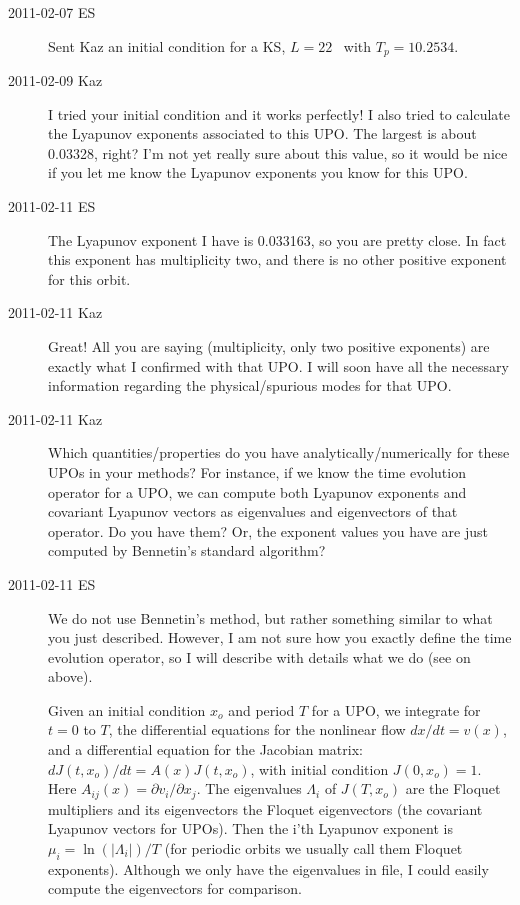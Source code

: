 \begin{description}
\item[2011-02-07 ES] Sent Kaz an initial condition for a KS, $L=22$ \po\
with $T_p=10.2534$.

\item[2011-02-09 Kaz] I tried your initial condition and it works perfectly!
I also tried to calculate the Lyapunov exponents associated to this UPO.
The largest is about 0.03328, right? I'm not yet really sure about this value,
so it would be nice if you let me know the Lyapunov exponents you know for this UPO.

\item[2011-02-11 ES] The Lyapunov exponent I have is 0.033163, so you
are pretty close. In fact this exponent has multiplicity two, and
there is no other positive exponent for this orbit.

\item[2011-02-11 Kaz] Great! All you are saying (multiplicity, only two positive
exponents) are exactly what I confirmed with that UPO. I will soon have all
the necessary information regarding the physical/spurious modes for that UPO.

\item[2011-02-11 Kaz] Which quantities/properties do you have
analytically/numerically for these UPOs in your methods? For instance,
if we know the time evolution operator for a UPO, we can compute both
Lyapunov exponents and covariant Lyapunov vectors as eigenvalues and
eigenvectors of that operator. Do you have them? Or, the exponent values
you have are just computed by Bennetin's standard algorithm?

\item[2011-02-11 ES] We do not use Bennetin's method, but rather
something similar to what you just described. However, I am not sure how
you exactly define the time evolution operator, so I will describe with
details what we do (see \refrem{rem:Lyapunov} on \refpage{rem:Lyapunov} above).

Given an initial condition $x_o$ and period $T$ for a UPO, we integrate
for $t=0$ to $T$, the differential equations for the nonlinear flow
$dx/dt=v(x)$, and a differential equation for the Jacobian matrix:
$dJ(t,x_o)/dt = A(x)J(t,x_o)$, with initial condition $J(0,x_o)=1$.
Here $A_{ij}(x)=\partial v_i/\partial x_j$. The eigenvalues $\Lambda_i$ of $J(T,x_o)$ are
the Floquet multipliers and its eigenvectors the Floquet eigenvectors
(the covariant Lyapunov vectors for UPOs). Then the i'th Lyapunov exponent is
$\mu_i = \ln(|\Lambda_i|)/ T$
(for periodic orbits we usually call them Floquet exponents).
Although we only have the eigenvalues in file, I could easily compute
the eigenvectors for comparison.


\end{description}
